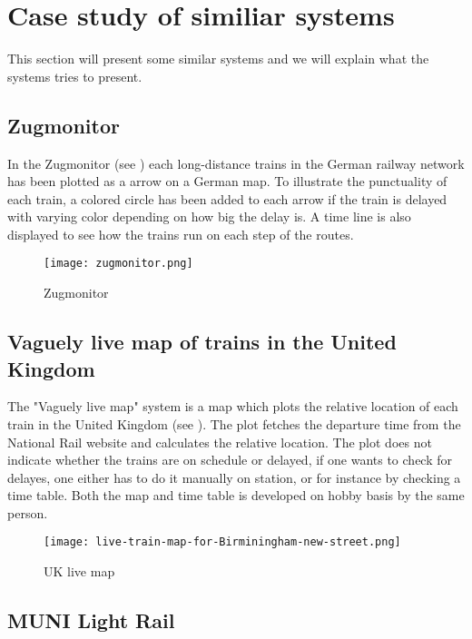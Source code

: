 \clearpage
\section{Case study of similiar systems}
\label{sect:backgroundExamples}
This section will present some similar systems and we will explain what the
systems tries to present.
\subsection{Zugmonitor}
\label{sub:subsection_zugmonitor}

In the Zugmonitor (see ) each long-distance 
trains in the German railway network has been plotted as a arrow on a German 
map. To illustrate the punctuality of each train, a colored circle has been 
added to each arrow if the train is delayed with varying color depending on 
how big the delay is. A time line is also displayed to see how the trains run 
on each step of the routes. 

\begin{figure}[!htbp]
	\texttt{[image: zugmonitor.png]}
	\caption[Zugmonitor]{Zugmonitor \cite{zugmonitor}}
	\label{fig:zugmonitor}
\end{figure}

\subsection{Vaguely live map of trains in the United Kingdom}
\label{sub:subsection_ukLiveMap}

The "Vaguely live map" system is a map which plots the relative location of 
each train in the United Kingdom (see ). The plot fetches 
the departure time from the  National Rail website and calculates the relative 
location. The plot does not indicate whether the trains are on schedule or 
delayed, if one wants to check for delayes, one either has to do it manually 
on station, or for instance by checking a time table\cite{trainTimesUK}. Both 
the map and time table is developed on hobby basis by the same person. 

\begin{figure}[!htbp]
	\texttt{[image: live-train-map-for-Birminingham-new-street.png]}
	\caption[UK live map]{UK live map \cite{ukLiveMap}}
	\label{fig:ukLiveMap}
\end{figure}

\subsection{MUNI Light Rail}
\label{sub:subsection_muniLightRail}

